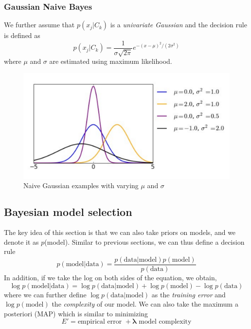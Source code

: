 \documentclass[a4paper,12pt]{article}
\begin{document}
\subsubsection{Gaussian Naive Bayes}
We further assume that $p(x_j|C_k)$ is a \textit{univariate Gaussian} and the decision rule is defined as
$$p(x_j|C_k) = \frac{1}{\sigma \sqrt{2\pi}}e^{-(x-\mu)^2/(2\sigma^2)}$$ 
where $\mu$ and $\sigma$ are estimated using maximum likelihood.
\begin{figure}[h]
\centering
\includegraphics[scale=0.3]{naivegaussian}
\caption{Naive Gaussian examples with varying $\mu$ and $\sigma$}
    \label{fig:creditscoring}
\end{figure} \pagebreak
\subsection{Bayesian model selection}
The key idea of this section is that we can also take priors on models, and we denote it as $p$(model). Similar to previous sections, we can thus define a decision rule
\begin{equation*}
p(\text{model}|\text{data}) = \frac{p(\text{data}|\text{model})p(\text{model})}{p(\text{data})}
\end{equation*}
In addition, if we take the log on both sides of the equation, we obtain,
$$\log p(\text{model}|\text{data}) = \log p(\text{data}|\text{model}) + \log p(\text{model}) - \log {p(\text{data})}$$
where we can further define $\log p(\text{data}|\text{model})$ as the \textit{training error} and $\log p(\text{model})$ the \textit{complexity} of our model. We can also take the maximum a posteriori (MAP) which is similar to minimizing 
$$E' = \text{empirical error } + \bm{\lambda} \text{ model complexity}$$
\end{document}

